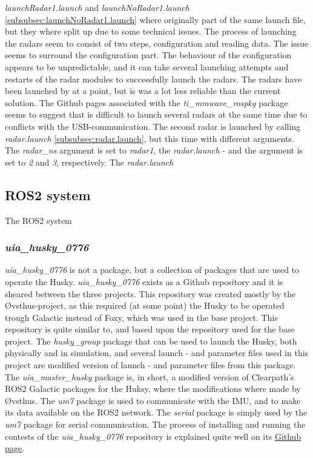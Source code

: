 \label{subsubsec:launchRadar1.launch}
\textit{launchRadar1.launch} and \textit{launchNoRadar1.launch} \ref{subsubsec:launchNoRadar1.launch} where originally part of the same launch file, but they where split up due to some technical issues. The process of launching the radars seem to consist of two steps, configuration and reading data. The issue seems to surround the configuration part. The behaviour of the configuration appears to be unpredictable, and it can take several launching attempts and restarts of the radar modules to successfully launch the radars. The radars have been launched by at a point, but is was a lot less reliable than the current solution. The Github pages associated with the \textit{ti\_mmwave\_rospkg} package seems to suggest that is difficult to launch several radars at the same time due to conflicts with the USB-communication. The second radar is launched by calling \textit{radar.launch} \ref{subsubsec:radar.launch}, but this time with different arguments. The \textit{radar\_ns} argument is set to \textit{radar1}, the \textit{radar.launch} - and the argument is set to \textit{2} and \textit{3}, respectively. The \textit{radar.launch}

\subsection{ROS2 system}
The ROS2 system 

\subsubsection{\textit{uia\_husky\_0776}}
\textit{uia\_husky\_0776} is not a package, but a collection of packages that are used to operate the Husky. \textit{uia\_husky\_0776} exists as a Github repository and it is sheared between the three projects. This repository was created mostly by the Øvsthus-project, as this required (at some point) the Husky to be operated trough Galactic instead of Foxy, which was used in the base project. This repository is quite similar to, and based upon the repository used for the base project. 
The \textit{husky\_group} package that can be used to launch the Husky, both physically and in simulation, and several launch - and parameter files used in this project are modified version of launch - and parameter files from this package. The \textit{uia\_master\_husky} package is, in short, a modified version of Clearpath's ROS2 Galactic packages for the Huksy, where the modifications where made by Øvsthus. The \textit{um7} package is used to communicate with the IMU, and to make its data available on the ROS2 network. The \textit{serial} package is simply used by the \textit{um7} package for serial communication. The process of installing and running the contests of the \textit{uia\_husky\_0776} repository is explained quite well on its \href{https://github.com/orjano-max/uia_husky_0776}{Github page}.

